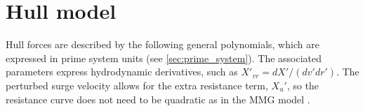 \section{Hull model} \label{sec:hull}
Hull forces are described by the following general polynomials, which are expressed in prime system units (see \autoref{sec:prime_system}). The associated parameters express hydrodynamic derivatives, such as ${X}'_{vr}=dX'/(dv'dr')$.
The perturbed surge velocity allows for the extra resistance term, ${X_u}'$, so the resistance curve does not need to be quadratic as in the MMG model \cite{yasukawaIntroductionMMGStandard2015}.  
\begin{equation}
    \label{eq:X_H}
    
\end{equation}
%
\begin{equation}
    \label{eq:Y_H}
    
\end{equation}
%
\begin{equation}
    \label{eq:N_H}
    
\end{equation}